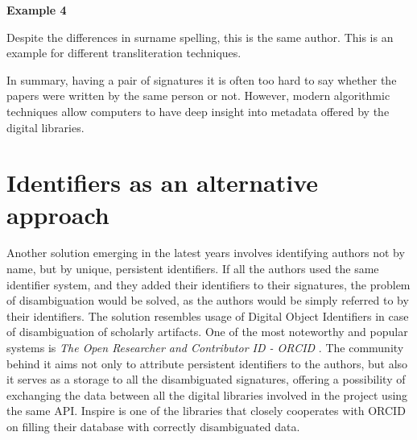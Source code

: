 \documentclass{pracamgr}
\begin{document}
\begin{center}
\textbf{Example 4} 
\label{ex4}


\end{center}

Despite the differences in surname spelling, this is the same author. This is an example for
different transliteration techniques.

In summary, having a pair of signatures it is often too hard to say whether the papers were
written by the same person or not. However, modern algorithmic techniques allow computers to
have deep insight into metadata offered by the digital libraries.

\section{Identifiers as an alternative approach}

Another solution emerging in the latest years involves identifying authors not by name, but
by unique, persistent identifiers. If all the authors used the same identifier system, and
they added their identifiers to their signatures, the problem of disambiguation would be
solved, as the authors would be simply referred to by their identifiers. The solution resembles
usage of Digital Object Identifiers in case of disambiguation of scholarly artifacts. One of
the most noteworthy and popular systems is
\textit{The Open Researcher and Contributor ID - ORCID} \citep{orcid}. The community behind
it aims not only to attribute persistent identifiers to the authors, but also it serves as
a storage to all the disambiguated signatures, offering a possibility of exchanging the data
between all the digital libraries involved in the project using the same API. Inspire is one of
the libraries that closely cooperates with ORCID on filling their database with correctly
disambiguated data.
\end{document}
